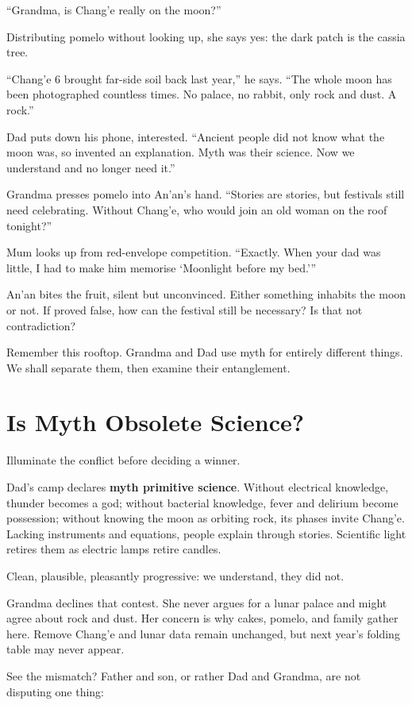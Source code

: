 ``Grandma, is Chang'e really on the moon?''

Distributing pomelo without looking up, she says yes: the dark patch is the cassia tree.

``Chang'e 6 brought far-side soil back last year,'' he says. ``The whole moon has been photographed countless times. No palace, no rabbit, only rock and dust. A rock.''

Dad puts down his phone, interested. ``Ancient people did not know what the moon was, so invented an explanation. Myth was their science. Now we understand and no longer need it.''

Grandma presses pomelo into An'an's hand. ``Stories are stories, but festivals still need celebrating. Without Chang'e, who would join an old woman on the roof tonight?''

Mum looks up from red-envelope competition. ``Exactly. When your dad was little, I had to make him memorise `Moonlight before my bed.'''

An'an bites the fruit, silent but unconvinced. Either something inhabits the moon or not. If proved false, how can the festival still be necessary? Is that not contradiction?

Remember this rooftop. Grandma and Dad use myth for entirely different things. We shall separate them, then examine their entanglement.

\section{Is Myth Obsolete Science?}
Illuminate the conflict before deciding a winner.

Dad's camp declares \textbf{myth primitive science}. Without electrical knowledge, thunder becomes a god; without bacterial knowledge, fever and delirium become possession; without knowing the moon as orbiting rock, its phases invite Chang'e. Lacking instruments and equations, people explain through stories. Scientific light retires them as electric lamps retire candles.

Clean, plausible, pleasantly progressive: we understand, they did not.

Grandma declines that contest. She never argues for a lunar palace and might agree about rock and dust. Her concern is why cakes, pomelo, and family gather here. Remove Chang'e and lunar data remain unchanged, but next year's folding table may never appear.

See the mismatch? Father and son, or rather Dad and Grandma, are not disputing one thing:

